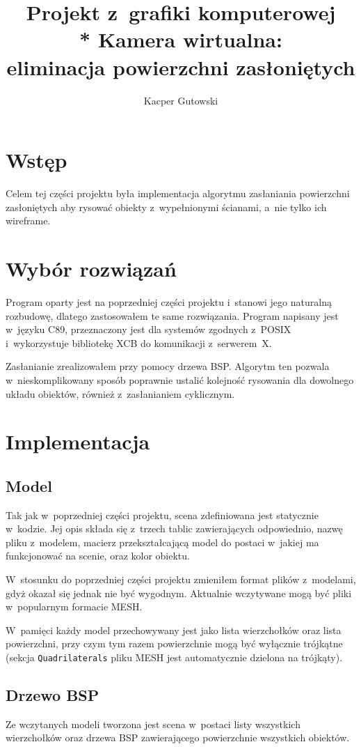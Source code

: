\documentclass[12pt,a4paper]{article}
\author{Kacper Gutowski}
\title{Projekt z~grafiki komputerowej\\*
Kamera wirtualna: \\ eliminacja powierzchni zasłoniętych}
\begin{document}
%
\maketitle

\section{Wstęp}
Celem tej części projektu była implementacja
algorytmu zasłaniania powierzchni zasłoniętych
aby rysować obiekty z~wypełnionymi ścianami,
a~nie tylko ich wire\dywiz frame.

\section{Wybór rozwiązań}
Program oparty jest na poprzedniej części projektu
i~stanowi jego naturalną rozbudowę, dlatego zastosowałem
te same rozwiązania.
Program napisany jest w~języku C89, przeznaczony jest dla systemów
zgodnych z~POSIX i~wykorzystuje bibliotekę XCB do komunikacji z~serwerem~X.

Zasłanianie zrealizowałem przy pomocy drzewa BSP.
Algorytm ten pozwala w~nieskomplikowany sposób
poprawnie ustalić kolejność rysowania dla dowolnego
układu obiektów, również z~zasłanianiem cyklicznym.

\section{Implementacja}
\subsection{Model}
Tak jak w~poprzedniej części projektu, scena zdefiniowana jest
statycznie w~kodzie.  Jej opis składa się z~trzech tablic
zawierających odpowiednio, nazwę pliku z~modelem,
macierz przekształcającą model do postaci w~jakiej ma funkcjonować
na scenie, oraz kolor obiektu.

W~stosunku do poprzedniej części projektu zmieniłem
format plików z~modelami, gdyż okazał się jednak nie być wygodnym.
Aktualnie wczytywane mogą być pliki w~popularnym formacie MESH.

W~pamięci każdy model przechowywany jest jako lista
wierzchołków oraz lista powierzchni, przy czym tym razem
powierzchnie mogą być wyłącznie trójkątne
(sekcja \texttt{Quadrilaterals} pliku MESH jest automatycznie dzielona na trójkąty).

\subsection{Drzewo BSP}
Ze wczytanych modeli tworzona jest scena w~postaci listy wszystkich wierzchołków
oraz drzewa BSP zawierającego powierzchnie wszystkich obiektów.
\end{document}
